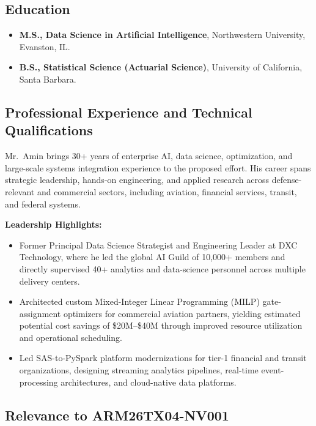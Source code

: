 \documentclass[11pt]{article}
\begin{document}
\subsection{Education}

\begin{itemize}
\item \textbf{M.S., Data Science in Artificial Intelligence}, Northwestern University, Evanston, IL.
\item \textbf{B.S., Statistical Science (Actuarial Science)}, University of California, Santa Barbara.
\end{itemize}

\subsection{Professional Experience and Technical Qualifications}

Mr.~Amin brings 30+ years of enterprise AI, data science, optimization, and large-scale systems integration experience to the proposed effort. His career spans strategic leadership, hands-on engineering, and applied research across defense-relevant and commercial sectors, including aviation, financial services, transit, and federal systems.

\textbf{Leadership Highlights:}

\begin{itemize}
\item Former Principal Data Science Strategist and Engineering Leader at DXC Technology, where he led the global AI Guild of 10,000+ members and directly supervised 40+ analytics and data-science personnel across multiple delivery centers.
\item Architected custom Mixed-Integer Linear Programming (MILP) gate-assignment optimizers for commercial aviation partners, yielding estimated potential cost savings of \$20M--\$40M through improved resource utilization and operational scheduling.
\item Led SAS-to-PySpark platform modernizations for tier-1 financial and transit organizations, designing streaming analytics pipelines, real-time event-processing architectures, and cloud-native data platforms.
\end{itemize}

\subsection{Relevance to ARM26TX04-NV001}
\end{document}
